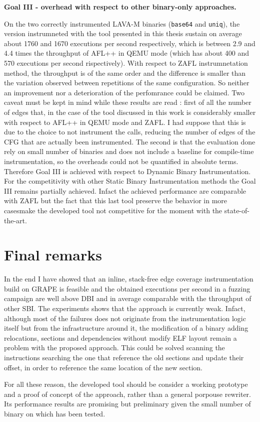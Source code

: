     \begin{center}
        \textbf{Goal III -  overhead with respect to other binary-only approaches.}
    \end{center} 
    On the two correctly instrumented LAVA-M binaries (\texttt{base64} and \texttt{uniq}), the version instrumneted 
    with the tool presented in this thesis sustain on average about 1760 and 1670 executions per second respectively, 
    which is between 2.9 and 4.4 times the throughput of AFL++ in QEMU mode (which has about 400 and 570 executions per second 
    rispectively).
    With respect to ZAFL instrumnetation method, the throughput is of the same order and the difference is smaller than the 
    variation observed between repetitions of the same configuration.
    So neither an improvement nor a deterioration of the perfomrance could be claimed.
    Two caveat must be kept in mind while these results are read : 
    first of all the number of edges that, in the case of the tool discussed in this 
    work is considerably smaller with respect to AFL++ in QEMU mode and ZAFL.
    I had suppose that this is due to the choice to not instrument the calls, reducing the number of edges of the \gls{CFG} 
    that are actually been instrumented.
    The second is that the evaluation done rely on small number of binaries and does not include a baseline 
    for compile-time instrumentation, so the overheads could not be quantified in absolute terms.
    Therefore Goal III is achieved with respect to Dynamic Binary Instrumentation. 
    For the competitivity with other Static Binary Instrumentation methods the Goal III remains partially achieved.
    Infact the achieved performance are comparable with ZAFL but the fact that this last tool preserve the behavior 
    in more casesmake the developed tool not competitive for the moment with the state-of-the-art.

\section{Final remarks}

    In the end I have showed that an inline, stack-free edge coverage instrumentation build on GRAPE is feasible 
    and the obtained executions per second in a fuzzing campaign are well above \gls{DBI} and in average comparable 
    with the throughput of other \gls{SBI}.
    The experiments shows that the approach is currently weak. 
    Infact, although most of the failures does not originate from the instrumentation logic itself but from the 
    infrastructure around it, the modification of a binary adding relocations, sections and dependencies without 
    modify \gls{ELF} layout remain a problem with the proposed approach.
    This could be solved scanning the instructions searching the one that reference the old sections 
    and update their offset, in order to reference the same location of the new section.

    For all these reason, the developed tool should be consider a working prototype and a proof of concept 
    of the approach, rather than a general porpouse rewriter.
    Its performance results are promising but preliminary given the small number of binary on which has been tested.
